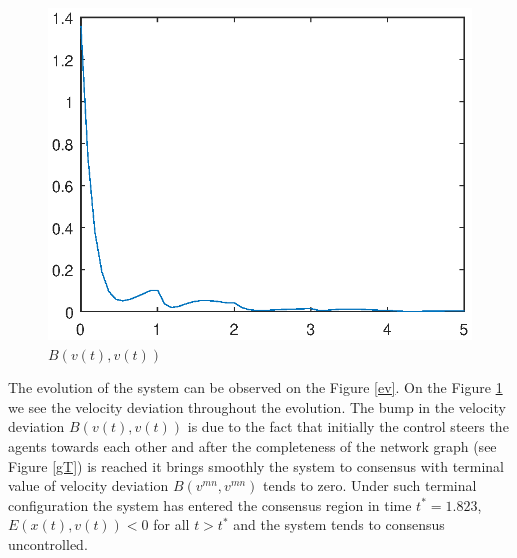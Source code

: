 \documentclass[a4paper, english]{article}
\begin{document}
 \begin{figure}[ht]
 \centering
 \includegraphics[scale=0.5]{figures/a5_D_lf.eps}
 \caption{$B(v(t), v(t))$}
 \label{lf}
 \end{figure}
  \newpage
The evolution of the system can be observed on the Figure \ref{ev}. On the Figure \ref{lf} we see the velocity deviation throughout the evolution. The bump in the velocity deviation $B(v(t), v(t))$
is due to the fact that initially the control steers the agents towards each other and after the completeness of the network graph (see Figure \ref{gT}) is reached it brings smoothly the system to consensus with terminal value of velocity deviation $B(v^{mn}, v^{mn})$ tends to zero. Under such terminal configuration the system has entered the consensus region in time  $t^* = 1.823$,  $E(x(t), v(t)) < 0$ for all $t>t^{*}$ and the system tends to consensus uncontrolled.
\end{document}
